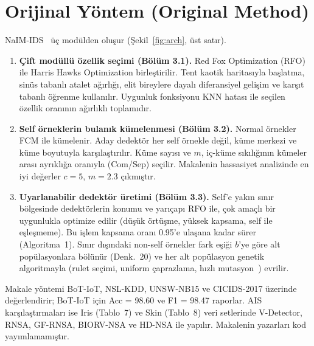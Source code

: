 \documentclass[11pt,a4paper]{article}
\begin{document}
\section{Orijinal Yöntem (Original Method)}

NaIM-IDS~\cite{ma2024} üç modülden oluşur (Şekil~\ref{fig:arch}, üst satır).

\begin{enumerate}
  \item \textbf{Çift modüllü özellik seçimi (Bölüm 3.1).} Red Fox Optimization (RFO)~\cite{polap2021} ile Harris Hawks Optimization birleştirilir. Tent kaotik haritasıyla başlatma, sinüs tabanlı atalet ağırlığı, elit bireylere dayalı diferansiyel gelişim ve karşıt tabanlı öğrenme kullanılır. Uygunluk fonksiyonu KNN hatası ile seçilen özellik oranının ağırlıklı toplamıdır.
  \item \textbf{Self örneklerin bulanık kümelenmesi (Bölüm 3.2).} Normal örnekler FCM ile kümelenir. Aday dedektör her self örnekle değil, küme merkezi ve küme boyutuyla karşılaştırılır. Küme sayısı ve $m$, iç-küme sıkılığının kümeler arası ayrıklığa oranıyla (Com/Sep) seçilir. Makalenin hassasiyet analizinde en iyi değerler $c=5$, $m=2.3$ çıkmıştır.
  \item \textbf{Uyarlanabilir dedektör üretimi (Bölüm 3.3).} Self'e yakın sınır bölgesinde dedektörlerin konumu ve yarıçapı RFO ile, çok amaçlı bir uygunlukla optimize edilir (düşük örtüşme, yüksek kapsama, self ile eşleşmeme). Bu işlem kapsama oranı 0.95'e ulaşana kadar sürer (Algoritma~1). Sınır dışındaki non-self örnekler fark eşiği $b$'ye göre alt popülasyonlara bölünür (Denk.~20) ve her alt popülasyon genetik algoritmayla (rulet seçimi, uniform çaprazlama, hızlı mutasyon~\cite{doerr2017}) evrilir.
\end{enumerate}

Makale yöntemi BoT-IoT, NSL-KDD, UNSW-NB15 ve CICIDS-2017 üzerinde değerlendirir; BoT-IoT için Acc = 98.60 ve F1 = 98.47 raporlar. AIS karşılaştırmaları ise Iris (Tablo~7) ve Skin (Tablo~8) veri setlerinde V-Detector, RNSA, GF-RNSA, BIORV-NSA ve HD-NSA ile yapılır. Makalenin yazarları kod yayımlamamıştır.
\end{document}
